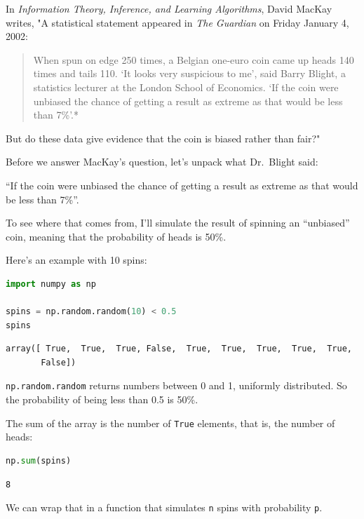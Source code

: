 In \emph{Information Theory, Inference, and Learning Algorithms}, David
MacKay writes, "A statistical statement appeared in \emph{The Guardian}
on Friday January 4, 2002:

\begin{quote}
When spun on edge 250 times, a Belgian one-euro coin came up heads 140
times and tails 110. `It looks very suspicious to me', said Barry
Blight, a statistics lecturer at the London School of Economics. `If the
coin were unbiased the chance of getting a result as extreme as that
would be less than 7\%'.*
\end{quote}

But do these data give evidence that the coin is biased rather than
fair?"

Before we answer MacKay's question, let's unpack what Dr.~Blight said:

``If the coin were unbiased the chance of getting a result as extreme as
that would be less than 7\%''.

To see where that comes from, I'll simulate the result of spinning an
``unbiased'' coin, meaning that the probability of heads is 50\%.

Here's an example with 10 spins:

\begin{lstlisting}[language=Python,style=source]
import numpy as np

spins = np.random.random(10) < 0.5
spins
\end{lstlisting}

\begin{lstlisting}[style=output]
array([ True,  True,  True, False,  True,  True,  True,  True,  True,
       False])
\end{lstlisting}

\passthrough{\lstinline!np.random.random!} returns numbers between 0 and
1, uniformly distributed. So the probability of being less than 0.5 is
50\%.

The sum of the array is the number of \passthrough{\lstinline!True!}
elements, that is, the number of heads:

\begin{lstlisting}[language=Python,style=source]
np.sum(spins)
\end{lstlisting}

\begin{lstlisting}[style=output]
8
\end{lstlisting}

We can wrap that in a function that simulates
\passthrough{\lstinline!n!} spins with probability
\passthrough{\lstinline!p!}.

